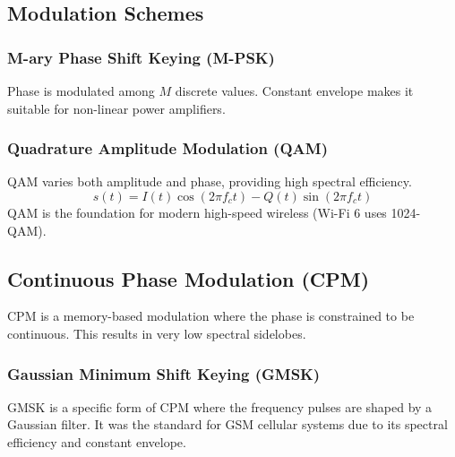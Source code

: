 \subsection{Modulation Schemes}
\subsubsection{M-ary Phase Shift Keying (M-PSK)}
Phase is modulated among $M$ discrete values. Constant envelope makes it suitable for non-linear power amplifiers.

\subsubsection{Quadrature Amplitude Modulation (QAM)}
QAM varies both amplitude and phase, providing high spectral efficiency.
\begin{equation}
    s(t) = I(t)\cos(2\pi f_c t) - Q(t)\sin(2\pi f_c t)
\end{equation}
QAM is the foundation for modern high-speed wireless (Wi-Fi 6 uses 1024-QAM).

\subsection{Continuous Phase Modulation (CPM)}
CPM is a memory-based modulation where the phase is constrained to be continuous. This results in very low spectral sidelobes.

\subsubsection{Gaussian Minimum Shift Keying (GMSK)}
GMSK is a specific form of CPM where the frequency pulses are shaped by a Gaussian filter. It was the standard for GSM cellular systems due to its spectral efficiency and constant envelope.

\begin{center}
\end{center}


